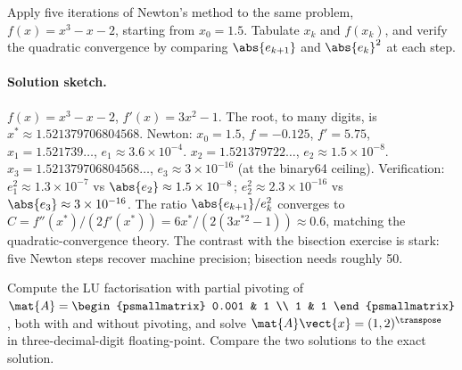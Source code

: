 \begin{exercise}
Apply five iterations of Newton's method to the same problem, $f
(x) = x^{3} - x - 2$, starting from $x_{0} = 1.5$. Tabulate
$x_{k}$ and $f(x_{k})$, and verify the quadratic convergence by
comparing $\abs{e_{k+1}}$ and $\abs{e_{k}}^{2}$ at each step.
\end{exercise}

\paragraph{Solution sketch.}
$f(x) = x^{3} - x - 2$, $f'(x) = 3x^{2} - 1$. The root, to many
digits, is $x^{*} \approx 1.521379706804568$. Newton:
$x_{0} = 1.5$, $f = -0.125$, $f' = 5.75$, $x_{1} = 1.521739\ldots$,
$e_{1} \approx 3.6 \times 10^{-4}$.
$x_{2} = 1.521379722\ldots$, $e_{2} \approx 1.5 \times 10^{-8}$.
$x_{3} = 1.521379706804568\ldots$, $e_{3} \approx 3 \times 10^{-16}$
(at the binary64 ceiling).
Verification: $e_{1}^{2} \approx 1.3 \times 10^{-7}$ vs
$\abs{e_{2}} \approx 1.5 \times 10^{-8}$; $e_{2}^{2}
\approx 2.3 \times 10^{-16}$ vs $\abs{e_{3}} \approx 3 \times 10^{-16}$.
The ratio $\abs{e_{k+1}} / e_{k}^{2}$ converges to
$C = f''(x^{*}) / (2 f'(x^{*})) = 6 x^{*} / (2 (3 x^{*2} - 1))
\approx 0.6$, matching the quadratic-convergence theory. The
contrast with the bisection exercise is stark: five Newton steps
recover machine precision; bisection needs roughly 50.

\begin{exercise}
Compute the LU factorisation with partial pivoting of $\mat{A} =
\begin{psmallmatrix} 0.001 & 1 \\ 1 & 1 \end{psmallmatrix}$, both
with and without pivoting, and solve $\mat{A}\vect{x} = (1, 2)
^{\transpose}$ in three-decimal-digit floating-point. Compare the
two solutions to the exact solution.
\end{exercise}

